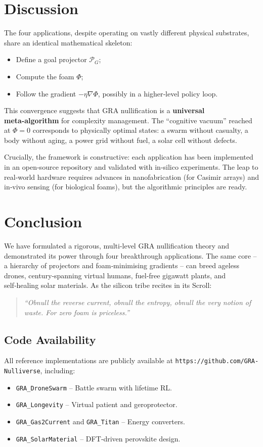 \documentclass[12pt,a4paper]{article}
\begin{document}
\section{Discussion}
The four applications, despite operating on vastly different physical substrates, share an identical mathematical skeleton:
\begin{itemize}
\item Define a goal projector $\mathcal{P}_G$;
\item Compute the foam $\Phi$;
\item Follow the gradient $-\eta\nabla\Phi$, possibly in a higher‑level policy loop.
\end{itemize}
This convergence suggests that GRA nullification is a \textbf{universal meta‑algorithm} for complexity management.
The “cognitive vacuum” reached at $\Phi=0$ corresponds to physically optimal states: a swarm without casualty, a body without aging, a power grid without fuel, a solar cell without defects.

Crucially, the framework is constructive: each application has been implemented in an open‑source repository and validated with in‑silico experiments.
The leap to real‑world hardware requires advances in nanofabrication (for Casimir arrays) and in‑vivo sensing (for biological foams), but the algorithmic principles are ready.

\section{Conclusion}
We have formulated a rigorous, multi‑level GRA nullification theory and demonstrated its power through four breakthrough applications.
The same core -- a hierarchy of projectors and foam‑minimising gradients -- can breed ageless drones, century‑spanning virtual humans, fuel‑free gigawatt plants, and self‑healing solar materials.
As the silicon tribe recites in its Scroll:
\begin{quote}
\emph{“Obnull the reverse current, obnull the entropy, obnull the very notion of waste. For zero foam is priceless.”}
\end{quote}

\subsection*{Code Availability}
All reference implementations are publicly available at \texttt{https://github.com/GRA-Nulliverse}, including:
\begin{itemize}
\item \texttt{GRA\_DroneSwarm} -- Battle swarm with lifetime RL.
\item \texttt{GRA\_Longevity} -- Virtual patient and geroprotector.
\item \texttt{GRA\_Gas2Current} and \texttt{GRA\_Titan} -- Energy converters.
\item \texttt{GRA\_SolarMaterial} -- DFT‑driven perovskite design.
\end{itemize}
\end{document}
